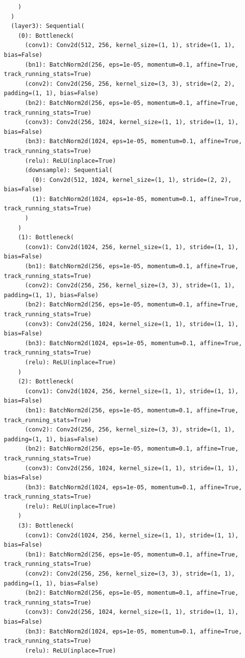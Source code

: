\documentclass{article}
\begin{document}
\begin{verbatim}
    )
  )
  (layer3): Sequential(
    (0): Bottleneck(
      (conv1): Conv2d(512, 256, kernel_size=(1, 1), stride=(1, 1), bias=False)
      (bn1): BatchNorm2d(256, eps=1e-05, momentum=0.1, affine=True, track_running_stats=True)
      (conv2): Conv2d(256, 256, kernel_size=(3, 3), stride=(2, 2), padding=(1, 1), bias=False)
      (bn2): BatchNorm2d(256, eps=1e-05, momentum=0.1, affine=True, track_running_stats=True)
      (conv3): Conv2d(256, 1024, kernel_size=(1, 1), stride=(1, 1), bias=False)
      (bn3): BatchNorm2d(1024, eps=1e-05, momentum=0.1, affine=True, track_running_stats=True)
      (relu): ReLU(inplace=True)
      (downsample): Sequential(
        (0): Conv2d(512, 1024, kernel_size=(1, 1), stride=(2, 2), bias=False)
        (1): BatchNorm2d(1024, eps=1e-05, momentum=0.1, affine=True, track_running_stats=True)
      )
    )
    (1): Bottleneck(
      (conv1): Conv2d(1024, 256, kernel_size=(1, 1), stride=(1, 1), bias=False)
      (bn1): BatchNorm2d(256, eps=1e-05, momentum=0.1, affine=True, track_running_stats=True)
      (conv2): Conv2d(256, 256, kernel_size=(3, 3), stride=(1, 1), padding=(1, 1), bias=False)
      (bn2): BatchNorm2d(256, eps=1e-05, momentum=0.1, affine=True, track_running_stats=True)
      (conv3): Conv2d(256, 1024, kernel_size=(1, 1), stride=(1, 1), bias=False)
      (bn3): BatchNorm2d(1024, eps=1e-05, momentum=0.1, affine=True, track_running_stats=True)
      (relu): ReLU(inplace=True)
    )
    (2): Bottleneck(
      (conv1): Conv2d(1024, 256, kernel_size=(1, 1), stride=(1, 1), bias=False)
      (bn1): BatchNorm2d(256, eps=1e-05, momentum=0.1, affine=True, track_running_stats=True)
      (conv2): Conv2d(256, 256, kernel_size=(3, 3), stride=(1, 1), padding=(1, 1), bias=False)
      (bn2): BatchNorm2d(256, eps=1e-05, momentum=0.1, affine=True, track_running_stats=True)
      (conv3): Conv2d(256, 1024, kernel_size=(1, 1), stride=(1, 1), bias=False)
      (bn3): BatchNorm2d(1024, eps=1e-05, momentum=0.1, affine=True, track_running_stats=True)
      (relu): ReLU(inplace=True)
    )
    (3): Bottleneck(
      (conv1): Conv2d(1024, 256, kernel_size=(1, 1), stride=(1, 1), bias=False)
      (bn1): BatchNorm2d(256, eps=1e-05, momentum=0.1, affine=True, track_running_stats=True)
      (conv2): Conv2d(256, 256, kernel_size=(3, 3), stride=(1, 1), padding=(1, 1), bias=False)
      (bn2): BatchNorm2d(256, eps=1e-05, momentum=0.1, affine=True, track_running_stats=True)
      (conv3): Conv2d(256, 1024, kernel_size=(1, 1), stride=(1, 1), bias=False)
      (bn3): BatchNorm2d(1024, eps=1e-05, momentum=0.1, affine=True, track_running_stats=True)
      (relu): ReLU(inplace=True)

\end{verbatim}
\end{document}
